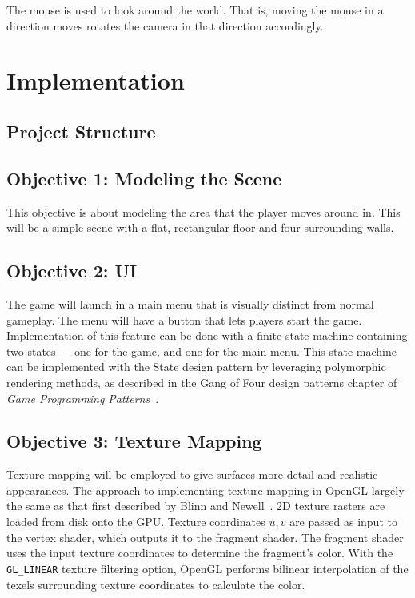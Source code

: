 \documentclass {article}
\begin{document}
The mouse is used to look around the world. That is, moving the mouse in a direction moves rotates the camera in that direction accordingly.

\section{Implementation}\label{sec:implementation}

\subsection{Project Structure}\label{sec:structure}

\subsection{Objective 1: Modeling the Scene}\label{sec:modelscene}
This objective is about modeling the area that the player moves around in. This will be a simple scene with a flat, rectangular floor and four surrounding walls.


\subsection{Objective 2: UI}\label{sec:ui}
The game will launch in a main menu that is visually distinct from normal gameplay. The menu will have a button that lets players start the game. Implementation of this feature can be done with a finite state machine containing two states --- one for the game, and one for the main menu. This state machine can be implemented with the State design pattern by leveraging polymorphic rendering methods, as described in the Gang of Four design patterns chapter of \textit{Game Programming Patterns}~\cite{state}.

\subsection{Objective 3: Texture Mapping}
Texture mapping will be employed to give surfaces more detail and realistic appearances. The approach to implementing texture mapping in OpenGL largely the same as that first described by Blinn and Newell~\cite{texture}. 2D texture rasters are loaded from disk onto the GPU. Texture coordinates $u, v$ are passed as input to the vertex shader, which outputs it to the fragment shader. The fragment shader uses the input texture coordinates to determine the fragment's color. With the \texttt{GL\_LINEAR} texture filtering option, OpenGL performs bilinear interpolation of the texels surrounding texture coordinates to calculate the color.
\end{document}
